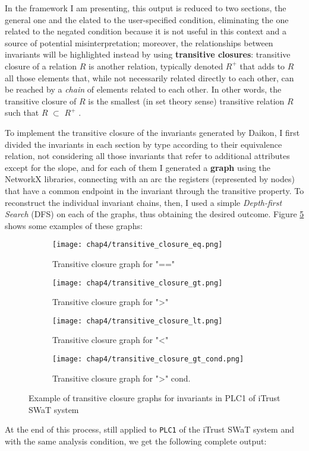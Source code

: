 In the framework I am presenting, this output is reduced to two sections, the general one and the elated to the user-specified condition, eliminating the one related to the negated condition because it is not useful in this context and a source of potential misinterpretation; moreover, the relationships between invariants will be highlighted instead by using \textbf{transitive closures}: transitive closure of a relation $R$ is another relation, typically denoted $R^{+}$ that adds to $R$ all those elements that, while not necessarily related directly to each other, can be reached by a \textit{chain} of elements related to each other. In other words, the transitive closure of $R$ is the smallest (in set theory sense) transitive relation $R$ such that $R$ $\subset$ $R^{+}$ \cite{transitive_closures}. 

\bigskip
To implement the transitive closure of the invariants generated by Daikon, I first divided the invariants in each section by type according to their equivalence relation, not considering all those invariants that refer to additional attributes except for the slope, and for each of them I generated a \textbf{graph} using the NetworkX libraries, connecting with an arc the registers (represented by nodes) that have a common endpoint in the invariant through the transitive property. To reconstruct the individual invariant chains, then, I used a simple \textit{Depth-first Search} (DFS) on each of the graphs, thus obtaining the desired outcome. Figure \ref{fig:4_transitive_closure_graphs} shows some examples of these graphs:

\begin{figure}[H]
	\centering
	\begin{subfigure}{0.48\textwidth}
		\texttt{[image: chap4/transitive\_closure\_eq.png]}
		\caption{Transitive closure graph for "=="}
		\label{subfig:4_graph_eq}
	\end{subfigure}
	\hfill
	\begin{subfigure}{0.48\textwidth}
		\texttt{[image: chap4/transitive\_closure\_gt.png]}
		\caption{Transitive closure graph for ">"}
		\label{subfig:4_graph_gt}
	\end{subfigure}
	\begin{subfigure}{0.48\textwidth}
		\texttt{[image: chap4/transitive\_closure\_lt.png]}
		\caption{Transitive closure graph for "<"}
		\label{subfig:4_graph_lt}
	\end{subfigure}
	\hfill
	\begin{subfigure}{0.48\textwidth}
		\texttt{[image: chap4/transitive\_closure\_gt\_cond.png]}
		\caption{Transitive closure graph for ">" cond.}
		\label{subfig:4_graph_gt_cond}
	\end{subfigure}
	\caption{Example of transitive closure graphs for invariants in PLC1 of iTrust SWaT system}
	\label{fig:4_transitive_closure_graphs}
\end{figure}
At the end of this process, still applied to \texttt{PLC1} of the iTrust SWaT system and with the same analysis condition, we get the following complete output:

